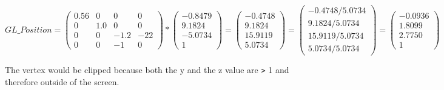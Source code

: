 $
    GL\_Position
=
    \left(\begin{array}{cccc}
        0.56 & 0   & 0    & 0 \\
        0    & 1.0 & 0    & 0 \\
        0    & 0   & -1.2 & -22 \\
        0    & 0   & -1   & 0
    \end{array}\right)
    *
    \left(\begin{array}{c}
        -0.8479\\
        9.1824\\
        -5.0734\\
        1        
    \end{array}\right)
=
    \left(\begin{array}{c}
        -0.4748\\
        9.1824\\
        15.9119\\
        5.0734
    \end{array}\right)
=
    \left(\begin{array}{c}
        -0.4748 / 5.0734\\
        9.1824 / 5.0734\\
        15.9119 / 5.0734\\
        5.0734 / 5.0734
    \end{array}\right)
=
    \left(\begin{array}{c}
        -0.0936\\
        1.8099\\
        2.7750\\
        1
    \end{array}\right)
$


The vertex would be clipped because both the y and the z value are \verb|>| 1 and therefore outside of the screen.
